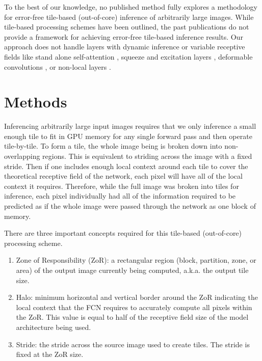 \documentclass[runningheads]{llncs}
\begin{document}
To the best of our knowledge, no published method fully explores a methodology for error-free tile-based (out-of-core) inference of arbitrarily large images. While tile-based processing schemes have been outlined, the past publications do not provide a framework for achieving error-free tile-based inference results. Our approach does not handle layers with dynamic inference or variable receptive fields like stand alone self-attention \cite{Ramachandran2019b}, squeeze and excitation layers \cite{Hu2018}, deformable convolutions \cite{Dai2017}, or non-local layers \cite{Wang2018c}. 


\section{Methods}
\label{methods}

Inferencing arbitrarily large input images requires that we only inference a small enough tile to fit in GPU memory for any single forward pass and then operate tile-by-tile. To form a tile, the whole image being is broken down into non-overlapping regions. This is equivalent to striding across the image with a fixed stride. Then if one includes enough local context around each tile to cover the theoretical receptive field of the network, each pixel will have all of the local context it requires. Therefore, while the full image was broken into tiles for inference, each pixel individually had all of the information required to be predicted as if the whole image were passed through the network as one block of memory. 

There are three important concepts required for this tile-based (out-of-core) processing scheme. 
\begin{enumerate}
	\item Zone of Responsibility (ZoR): a rectangular region (block, partition, zone, or area) of the output image currently being computed, a.k.a. the output tile size.
	\item Halo: minimum horizontal and vertical border around the ZoR indicating the local context that the FCN requires to accurately compute all pixels within the ZoR. This value is equal to half of the receptive field size of the model architecture being used. 
	\item Stride: the stride across the source image used to create tiles. The stride is fixed at the ZoR size.
\end{enumerate}
\end{document}
